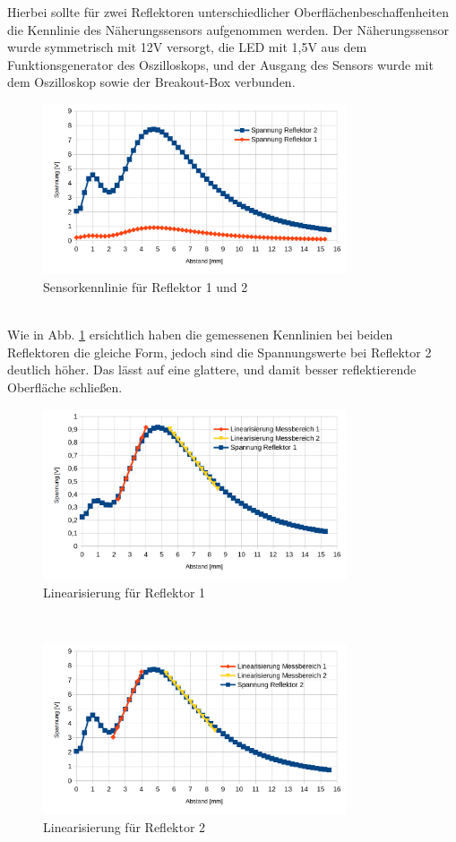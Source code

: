 Hierbei sollte für zwei Reflektoren unterschiedlicher Oberflächenbeschaffenheiten die Kennlinie des Näherungssensors aufgenommen werden. Der Näherungssensor wurde symmetrisch mit 12V versorgt, die LED mit 1,5V aus dem Funktionsgenerator des Oszilloskops, und der Ausgang des Sensors wurde mit dem Oszilloskop sowie der Breakout-Box verbunden.
\begin{figure}[h]
	\centering
	\includegraphics[width=0.8\textwidth]{./img/ch6/Kennlinie_Reflektor_1_und_2}
	\caption{Sensorkennlinie für Reflektor 1 und 2}
	\label{fg:kenn_refl}
\end{figure}
~\\
Wie in Abb. \ref{fg:kenn_refl} ersichtlich haben die gemessenen Kennlinien bei beiden Reflektoren die gleiche Form, jedoch sind die Spannungswerte bei Reflektor 2 deutlich höher. Das lässt auf eine glattere, und damit besser reflektierende Oberfläche schließen.
\begin{figure}[h]
	\centering
	\includegraphics[width=0.8\textwidth]{./img/ch6/Linearisierung_Reflektor_1}
	\caption{Linearisierung für Reflektor 1}
	\label{fg:kenn_linear1}
\end{figure}
~\\\begin{figure}[h]
	\centering
	\includegraphics[width=0.8\textwidth]{./img/ch6/Linearisierung_Reflektor_2}
	\caption{Linearisierung für Reflektor 2}
	\label{fg:kenn_linear2}
\end{figure}
